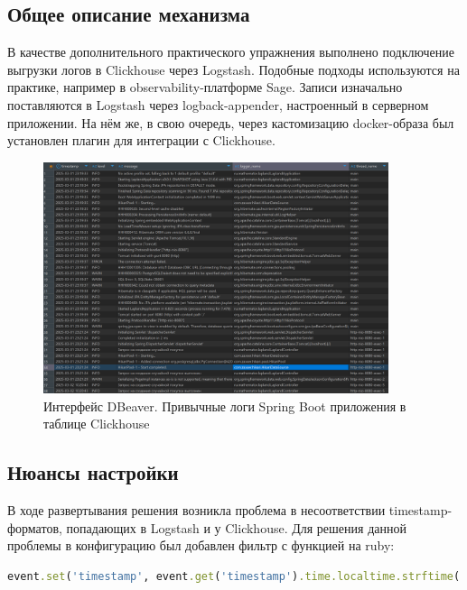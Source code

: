 \subsection{Общее описание механизма}\label{subsec:clickhousecommon}
В качестве дополнительного практического упражнения выполнено подключение выгрузки логов в Clickhouse через
Logstash.
Подобные подходы используются на практике, например в observability-платформе Sage.
Записи изначально поставляются в Logstash через logback-appender, настроенный в серверном приложении.
На нём же, в свою очередь, через кастомизацию docker-образа был установлен плагин для интеграции с Clickhouse.

\begin{figure}[htbp]
    \centering
    \includegraphics[width=0.9\textwidth]{clickhouse} %
    \caption{Интерфейс DBeaver. Привычные логи Spring Boot приложения в таблице Clickhouse}\label{fig:clickhouse}
\end{figure}

\subsection{Нюансы настройки}\label{subsec:clickhousedetails}
В ходе развертывания решения возникла проблема в несоответствии timestamp-форматов, попадающих в Logstash и у
Clickhouse.
Для решения данной проблемы в конфигурацию был добавлен фильтр с функцией на ruby:
\begin{lstlisting}[language=ruby, frame=single, keepspaces=true, showstringspaces=false, basicstyle=\normalsize\ttfamily, breaklines=true,label={lst:rubylist}]
event.set('timestamp', event.get('timestamp').time.localtime.strftime('%Y-%m-%d %H:%M:%S'))
\end{lstlisting}


